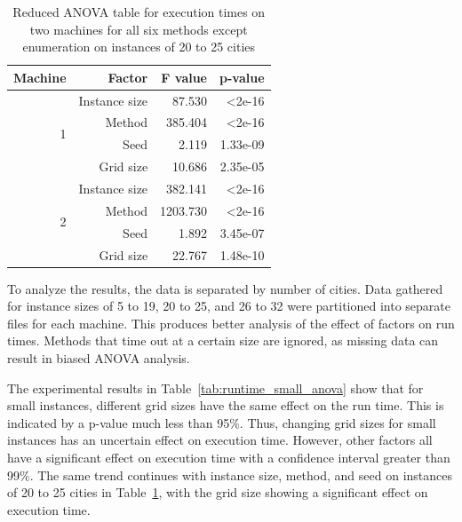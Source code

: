 \documentclass[11pt]{article}
\begin{document}
\begin{table}
	\centering
	\begin{tabular}{r|r|rr}
		Machine & Factor & F value & p-value  \\
		\hline
		\hline
		\multirow{4}{*}{1} 
		& Instance size             & 87.530 & \textless 2e-16 \\
		& Method             & 385.404 & \textless 2e-16 \\
		\cline{2-4}
		& Seed            & 2.119 & 1.33e-09 \\
		& Grid size & 10.686 & 2.35e-05 \\
		\hline
		\multirow{4}{*}{2}
		& Instance size             & 382.141 & \textless 2e-16 \\
		& Method             & 1203.730 & \textless 2e-16 \\
		\cline{2-4}
		& Seed            &  1.892 & 3.45e-07\\
		& Grid size & 22.767 & 1.48e-10 \\
	\end{tabular}
	\caption{Reduced ANOVA table for execution times on two machines for all six methods except enumeration on instances of 20 to 25 cities}
	\label{tab:runtime_medium_anova}
\end{table}
	To analyze the results, the data is separated by number of cities. Data gathered for instance sizes of 5 to 19, 20 to 25, and 26 to 32 were partitioned into separate files for each machine. This  produces better analysis of the effect of factors on run times. Methods that time out at a certain size are ignored, as missing data can result in biased ANOVA analysis. 
	
	The experimental results in Table~\ref{tab:runtime_small_anova} show that for small instances, different grid sizes have the same effect on the run time. This is indicated by a p-value much less than 95\%. Thus, changing grid sizes for small instances has an uncertain effect on execution time. However, other factors all have a significant effect on execution time with a confidence interval greater than 99\%. The same trend continues with instance size, method, and seed on instances of 20 to 25 cities in Table~\ref{tab:runtime_medium_anova}, with the grid size showing a significant effect on execution time. 

	
	
	
\end{document}
